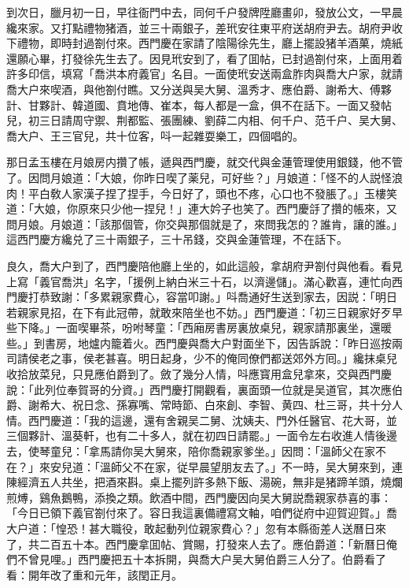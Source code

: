 到次日，臘月初一日，早往衙門中去，同何千户發牌陞廳畫卯，發放公文，一早晨纔來家。又打點禮物猪酒，並三十兩銀子，差玳安往東平府送胡府尹去。胡府尹收下禮物，即時封過劄付來。西門慶在家請了陰陽徐先生，廳上擺設猪羊酒菓，燒紙還願心畢，打發徐先生去了。因見玳安到了，看了囬帖，已封過劄付來，上面用着許多印信，填寫「喬洪本府義官」名目。一面使玳安送兩盒胙肉與喬大户家，就請喬大户來喫酒，與他劄付瞧。又分送與吴大舅、溫秀才、應伯爵、謝希大、傅夥計、甘夥計、韓道國、賁地傳、崔本，每人都是一盒，俱不在話下。一面又發帖兒，初三日請周守禦、荆都監、張團練、劉薛二内相、何千户、范千户、吴大舅、喬大户、王三官兒，共十位客，呌一起雜耍樂工，四個唱的。

那日孟玉樓在月娘房内攢了帳，遞與西門慶，就交代與金蓮管理使用銀錢，他不管了。因問月娘道：「大娘，你昨日喫了薬兒，可好些？」月娘道：「怪不的人説怪浪肉！平白敎人家漢子捏了捏手，今日好了，頭也不疼，心口也不發脹了。」玉樓笑道：「大娘，你原來只少他一捏兒！」連大妗子也笑了。西門慶㧱了攢的帳來，又問月娘。月娘道：「該那個管，你交與那個就是了，來問我怎的？誰肯，讓的誰。」這西門慶方纔兑了三十兩銀子，三十吊錢，交與金蓮管理，不在話下。

良久，喬大户到了，西門慶陪他廳上坐的，如此這般，拿胡府尹劄付與他看。看見上寫「義官喬洪」名字，「援例上納白米三十石，以濟邊儲」。滿心歡喜，連忙向西門慶打恭致謝：「多累親家費心，容當叩謝。」呌喬通好生送到家去，因説：「明日若親家見招，在下有此冠帶，就敢來陪坐也不妨。」西門慶道：「初三日親家好歹早些下降。」一面喫畢茶，吩咐琴童：「西廂房書房裏放桌兒，親家請那裏坐，還暖些。」到書房，地爐内籠着火。西門慶與喬大户對面坐下，因告訴說：「昨日巡按兩司請侯老之事，侯老甚喜。明日起身，少不的俺同僚們都送郊外方囘。」纔抹桌兒收拾放菜兒，只見應伯爵到了。斂了幾分人情，呌應寳用盒兒拿來，交與西門慶說：「此列位奉賀哥的分資。」西門慶打開觀看，裏面頭一位就是吴道官，其次應伯爵、謝希大、祝日念、孫寡嘴、常時節、白來創、李智、黄四、杜三哥，共十分人情。西門慶道：「我的這邊，還有舍親吴二舅、沈姨夫、門外任醫官、花大哥，並三個夥計、溫葵軒，也有二十多人，就在初四日請罷。」一面令左右收進人情後邊去，使琴童兒：「拿馬請你吴大舅來，陪你喬親家爹坐。」因問：「溫師父在家不在？」來安兒道：「溫師父不在家，従早晨望朋友去了。」不一時，吴大舅來到，連陳經濟五人共坐，把酒來斟。桌上擺列許多熱下飯、湯碗，無非是猪蹄羊頭，燒爛煎煿，鷄魚鵝鴨，添換之類。飲酒中間，西門慶因向吴大舅説喬親家恭喜的事：「今日已領下義官劄付來了。容日我這裏備禮寫文軸，咱們従府中迎賀迎賀。」喬大户道：「惶恐！甚大職役，敢起動列位親家費心？」忽有本縣衙差人送曆日來了，共二百五十本。西門慶拿囬帖、賞賜，打發來人去了。應伯爵道：「新曆日俺們不曾見哩。」西門慶把五十本拆開，與喬大户吴大舅伯爵三人分了。伯爵看了看：開年改了重和元年，該閏正月。

